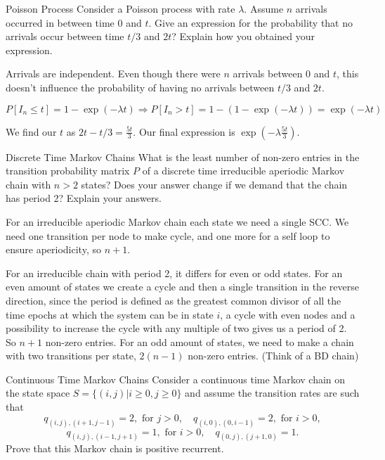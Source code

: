 \begin{problem}{Poisson Process}
Consider a Poisson process with rate $ \lambda$. Assume $n$ arrivals occurred in between time $0$ and $t$. Give an expression for the probability that no arrivals occur between time $t/3$ and $2t$? Explain how you obtained your expression.
\end{problem}

\begin{solution}
  Arrivals are independent. Even though there were $n$ arrivals between $0$ and $t$, this doesn't influence the probability of having no arrivals between $t/3$ and $2t$.

  \[
    P[I_n \leq t] = 1 - \exp(-\lambda t) \Rightarrow P[I_n > t] = 1 - (1 - \exp(-\lambda t)) = \exp(-\lambda t)
  \]

  We find our $t$ as $2t -t/3 = \frac{5t}{3}$. Our final expression is $\exp(-\lambda \frac{5t}{3})$.
\end{solution}

\begin{problem}{Discrete Time Markov Chains}
What is the least number of non-zero entries in the transition probability matrix $P$ of a discrete time irreducible aperiodic Markov chain with $n > 2$ states? Does your answer change if we demand that the chain has period 2? Explain your answers.
\end{problem}

\begin{solution}
  For an irreducible aperiodic Markov chain each state we need a single SCC. We need one transition per node to make cycle, and one more for a self loop to ensure aperiodicity, so $n+1$.

  For an irreducible chain with period 2, it differs for even or odd states. For an even amount of states we create a cycle and then a single transition in the reverse direction, since the period is defined as the greatest common divisor of all the time epochs at which the system can be in state $i$, a cycle with even nodes and a possibility to increase the cycle with any multiple of two gives us a period of 2. So $n+1$ non-zero entries.
  For an odd amount of states, we need to make a chain with two transitions per state, $2(n-1)$ non-zero entries. (Think of a BD chain)

\end{solution}

\begin{problem}{Continuous Time Markov Chains}
Consider a continuous time Markov chain on the state space $S = \{(i, j)|i \geq 0, j \geq 0\}$ and assume the transition rates are such that
\[
q_{(i,j),(i+1,j-1)} = 2, \text{ for } j > 0, \quad
q_{(i,0),(0,i-1)} = 2, \text{ for } i > 0,
\]
\[
q_{(i,j),(i-1,j+1)} = 1, \text{ for } i > 0, \quad
q_{(0,j),(j+1,0)} = 1.
\]
Prove that this Markov chain is positive recurrent.
\end{problem}

